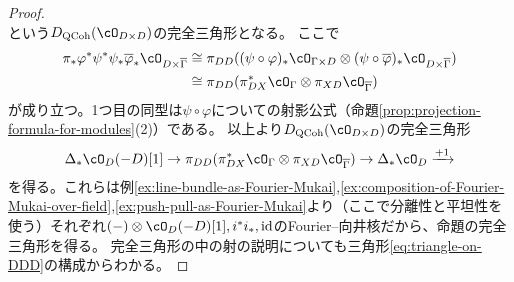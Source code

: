 \documentclass[uplatex, a4paper, dvipdfmx]{jsarticle}
\theoremstyle{definition}
\DeclareMathOperator{\id}{\mathrm{id}}
\DeclareMathOperator{\QCoh}{\mathrm{QCoh}}
\begin{document}
\begin{proof}
\begin{equation}
    \end{equation}
    という$D_{\QCoh}(\cO_{D \times D})$の完全三角形となる。
    ここで
    \begin{align}
        \pi_*\varphi^*\psi^*\psi_*\overline{\varphi}_*\cO_{D \times \overline{\Gamma}} & \cong \pi_{DD}((\psi \circ \varphi)_*\cO_{\Gamma \times D} \otimes (\psi \circ \overline{\varphi})_*\cO_{D \times \overline{\Gamma}}) \\
                                                                                       & \cong \pi_{DD}(\pi_{DX}^*\cO_{\Gamma} \otimes \pi_{XD}\cO_{\overline{\Gamma}})
    \end{align}
    が成り立つ。1つ目の同型は$\psi \circ \varphi$についての射影公式（命題\ref{prop:projection-formula-for-modules}(2)）である。
    以上より$D_{\QCoh}(\cO_{D \times D})$の完全三角形
    \begin{equation}\label{eq:triangle-on-DD}
        \Delta_*\cO_D(-D)[1] \to \pi_{DD}(\pi_{DX}^*\cO_{\Gamma} \otimes \pi_{XD}\cO_{\overline{\Gamma}}) \to \Delta_*\cO_D \xrightarrow{+1}
    \end{equation}
    を得る。これらは例\ref{ex:line-bundle-as-Fourier-Mukai},\ref{ex:composition-of-Fourier-Mukai-over-field},\ref{ex:push-pull-as-Fourier-Mukai}より（ここで分離性と平坦性を使う）それぞれ$(-)\otimes \cO_D(-D)[1], i^*i_*, \id$のFourier--向井核だから、命題の完全三角形を得る。
    完全三角形の中の射の説明についても三角形\eqref{eq:triangle-on-DDD}の構成からわかる。
\end{proof}


\printbibliography[title=参考文献]
\end{document}
